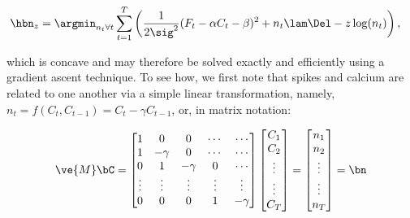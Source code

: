 \begin{align} \label{eq:eta}
\hbn_{\zzz} &= \argmin_{n_t \forall t}  \sum_{t=1}^T \left( \frac{1}{2 \sig^2}(F_t -\alpha C_t - \beta)^2  +  n_t  \lam \Del - \zzz \log(n_t) \right),
\end{align}

\noindent which is concave and may therefore be solved exactly and efficiently using a gradient ascent technique. To see how, we first note that   
spikes and calcium are related to one another via a simple linear transformation, namely, $n_t=f(C_t,C_{t-1})= C_t - \gamma C_{t-1}$, or, in matrix notation: 

\begin{align} \label{eq:M}
\ve{M} \bC = %
\begin{bmatrix}
1 & 0  & 0 & \cdots & \cdots \\
1 & -\gamma & 0 & \cdots & \cdots \\
0 & 1 & -\gamma & 0 & \cdots  \\
\vdots & \vdots & \vdots & \vdots & \vdots  \\
0 & 0 & 0 & 1 & -\gamma
\end{bmatrix}
\begin{bmatrix}
C_1 \\ C_2 \\ \vdots \\ \vdots \\ C_T  
\end{bmatrix}
= 
\begin{bmatrix}
n_1 \\ n_2 \\ \vdots \\ \vdots \\ n_T
\end{bmatrix}
= \bn
\end{align}

